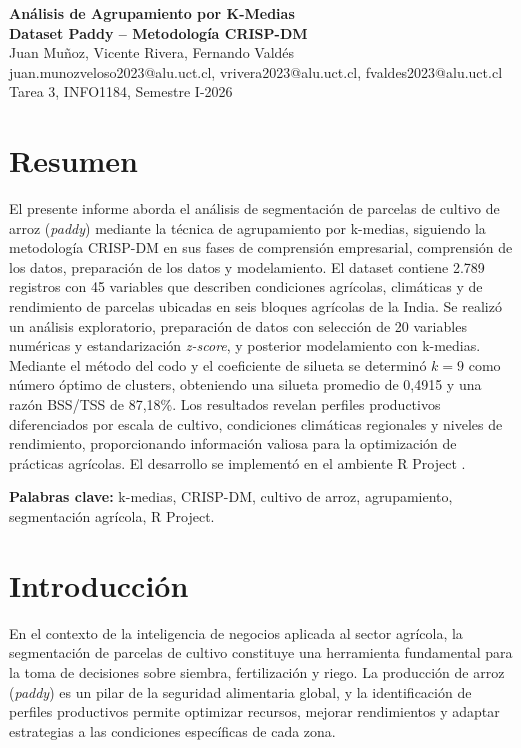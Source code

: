 \documentclass[10pt,a4paper]{article}
\begin{document}
\begin{center}
  {\LARGE \textbf{Análisis de Agrupamiento por K-Medias}} \\[4pt]
  {\LARGE \textbf{Dataset Paddy -- Metodología CRISP-DM}} \\[10pt]
  {\normalsize Juan Muñoz, Vicente Rivera, Fernando Valdés} \\[2pt]
  {\small juan.munozveloso2023@alu.uct.cl, vrivera2023@alu.uct.cl, fvaldes2023@alu.uct.cl} \\[2pt]
  {\small Tarea 3, INFO1184, Semestre I-2026}
\end{center}

\section*{Resumen}

El presente informe aborda el análisis de segmentación de parcelas de cultivo de arroz (\textit{paddy}) mediante la técnica de agrupamiento por k-medias, siguiendo la metodología CRISP-DM en sus fases de comprensión empresarial, comprensión de los datos, preparación de los datos y modelamiento. El dataset contiene 2.789 registros con 45 variables que describen condiciones agrícolas, climáticas y de rendimiento de parcelas ubicadas en seis bloques agrícolas de la India. Se realizó un análisis exploratorio, preparación de datos con selección de 20 variables numéricas y estandarización \textit{z-score}, y posterior modelamiento con k-medias. Mediante el método del codo y el coeficiente de silueta se determinó $k = 9$ como número óptimo de clusters, obteniendo una silueta promedio de 0,4915 y una razón BSS/TSS de 87,18\%. Los resultados revelan perfiles productivos diferenciados por escala de cultivo, condiciones climáticas regionales y niveles de rendimiento, proporcionando información valiosa para la optimización de prácticas agrícolas. El desarrollo se implementó en el ambiente R Project \parencite{rcore2024}.

\textbf{Palabras clave:} k-medias, CRISP-DM, cultivo de arroz, agrupamiento, segmentación agrícola, R Project.

\section{Introducción}

En el contexto de la inteligencia de negocios aplicada al sector agrícola, la segmentación de parcelas de cultivo constituye una herramienta fundamental para la toma de decisiones sobre siembra, fertilización y riego. La producción de arroz (\textit{paddy}) es un pilar de la seguridad alimentaria global, y la identificación de perfiles productivos permite optimizar recursos, mejorar rendimientos y adaptar estrategias a las condiciones específicas de cada zona.
\end{document}
